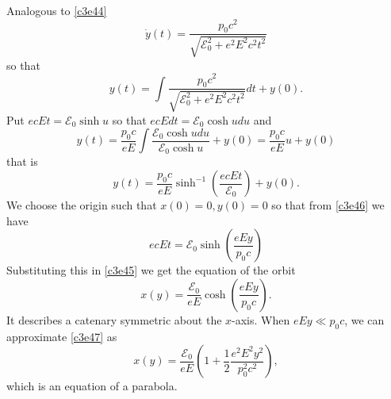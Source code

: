 \begin{enumerate}
Analogous to \eqref{c3e44}
\[
\dot{y}(t) = \frac{p_0c^2}{\sqrt{\mathcal{E}_0^2 + e^2E^2c^2t^2}}
\]
so that
\[
y(t) = \int \frac{p_0c^2}{\sqrt{\mathcal{E}_0^2 + e^2E^2c^2t^2}} dt + y(0).
\]
Put $ecEt = \mathcal{E}_0\sinh u$ so that $ecEdt = \mathcal{E}_0\cosh u du$
and
\[
y(t) = \frac{p_0c}{eE}\int \frac{\mathcal{E}_0\cosh u du}{\mathcal{E}_0\cosh u}
 + y(0) = \frac{p_0c}{eE} u + y(0) 
\]
that is
\begin{equation}\label{c3e46}
y(t) = \frac{p_0c}{eE} \sinh^{-1}\left(\frac{ecEt}{\mathcal{E}_0}\right) + y(0).
\end{equation}
We choose the origin such that $x(0) = 0, y(0) = 0$ so that from \eqref{c3e46}
we have
\[
ecEt = \mathcal{E}_0\sinh\left(\frac{eEy}{p_0c}\right)
\]
Substituting this in \eqref{c3e45} we get the equation of the orbit
\begin{equation}\label{c3e47}
x(y) = \frac{\mathcal{E}_0}{eE}\cosh\left(\frac{eEy}{p_0c}\right).
\end{equation}
It describes a catenary symmetric about the $x$-axis. When $eEy \ll p_0c$, we
can approximate \eqref{c3e47} as
\begin{equation}\label{c3e48}
x(y) = \frac{\mathcal{E}_0}{eE}
	\left(1 + \frac{1}{2}\frac{e^2E^2y^2}{p_0^2c^2}\right),
\end{equation}
which is an equation of a parabola.


\end{enumerate}
